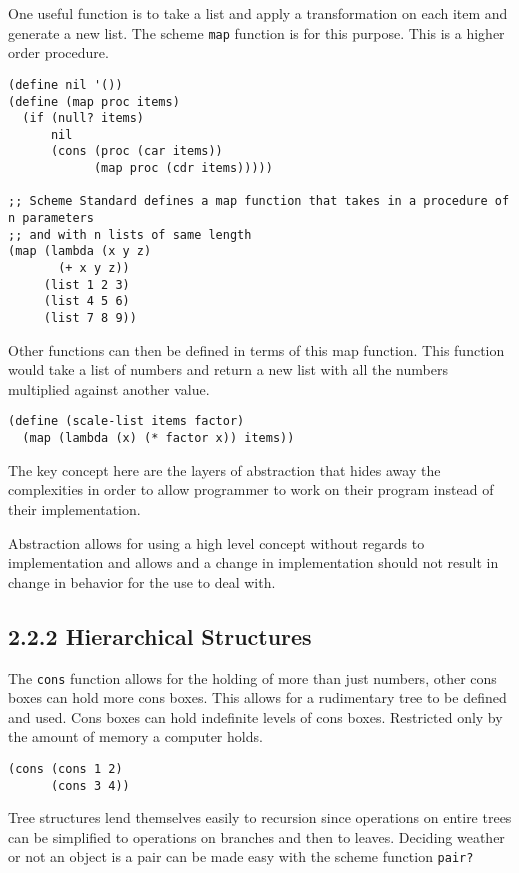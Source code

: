 \documentclass[11pt]{article}
\begin{document}
One useful function is to take a list and apply a transformation on each
item and generate a new list. The scheme \texttt{map} function is for this
purpose. This is a higher order procedure.

\begin{verbatim}
(define nil '())
(define (map proc items)
  (if (null? items)
      nil
      (cons (proc (car items))
            (map proc (cdr items)))))

;; Scheme Standard defines a map function that takes in a procedure of n parameters
;; and with n lists of same length
(map (lambda (x y z)
       (+ x y z))
     (list 1 2 3)
     (list 4 5 6)
     (list 7 8 9))
\end{verbatim}

Other functions can then be defined in terms of this map function. This function
would take a list of numbers and return a new list with all the numbers multiplied
against another value.


\begin{verbatim}
(define (scale-list items factor)
  (map (lambda (x) (* factor x)) items))
\end{verbatim}

The key concept here are the layers of abstraction that hides away the
complexities in order to allow programmer to work on their program
instead of their implementation.

Abstraction allows for using a high level concept without regards to
implementation and allows and a change in implementation should not
result in change in behavior for the use to deal with.

\subsection{2.2.2 Hierarchical Structures}
\label{sec:orgcdbd432}

The \texttt{cons} function allows for the holding of more than just numbers,
other cons boxes can hold more cons boxes. This allows for a rudimentary
tree to be defined and used. Cons boxes can hold indefinite levels of
cons boxes. Restricted only by the amount of memory a computer holds.

\begin{verbatim}
(cons (cons 1 2)
      (cons 3 4))
\end{verbatim}

Tree structures lend themselves easily to recursion since operations on
entire trees can be simplified to operations on branches and then to
leaves. Deciding weather or not an object is a pair can be made easy
with the scheme function \texttt{pair?}
\end{document}
